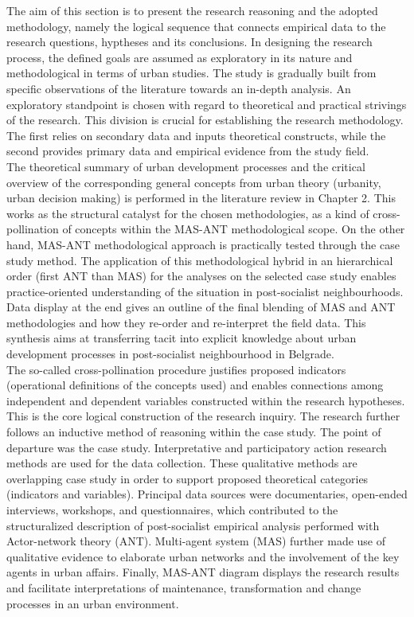 \documentclass[11pt]{report}
\begin{document}
The aim of this section is to present the research reasoning and the adopted methodology, namely the logical sequence that connects empirical data to the research questions, hyptheses and its conclusions. In designing the research process, the defined goals are assumed as exploratory in its nature and methodological in terms of urban studies. The study is gradually built from specific observations of the literature towards an in-depth analysis. An exploratory standpoint is chosen with regard to theoretical and practical strivings of the research. This division is crucial for establishing the research methodology. The first relies on secondary data and inputs theoretical constructs, while the second provides primary data and empirical evidence from the study field.
\\
The theoretical summary of urban development processes and the critical overview of the corresponding general concepts from urban theory (urbanity, urban decision making) is performed in the literature review in Chapter 2. This works as the structural catalyst for the chosen methodologies, as a kind of cross-pollination of concepts within the MAS-ANT methodological scope. On the other hand, MAS-ANT methodological approach is practically tested through the case study method. The application of this methodological hybrid in an hierarchical order (first ANT than MAS) for the analyses on the selected case study enables practice-oriented understanding of the situation in post-socialist neighbourhoods. Data display at the end gives an outline of the final blending of MAS and ANT methodologies and how they re-order and re-interpret the field data. This synthesis aims at transferring tacit into explicit knowledge about urban development processes in post-socialist neighbourhood in Belgrade.
\\
The so-called cross-pollination procedure justifies proposed indicators (operational definitions of the concepts used) and enables connections among independent and dependent variables constructed within the research hypotheses. This is the core logical construction of the research inquiry. The research further follows an inductive method of reasoning within the case study. The point of departure was the case study. Interpretative and participatory action research methods are used for the data collection. These qualitative methods are overlapping case study in order to support proposed theoretical categories (indicators and variables). Principal data sources were documentaries, open-ended interviews, workshops, and questionnaires, which contributed to the structuralized description of post-socialist empirical analysis performed with Actor-network theory (ANT). Multi-agent system (MAS) further made use of qualitative evidence to elaborate urban networks and the involvement of the key agents in urban affairs. Finally, MAS-ANT diagram displays the research results and facilitate interpretations of maintenance, transformation and change processes in an urban environment.
\end{document}
